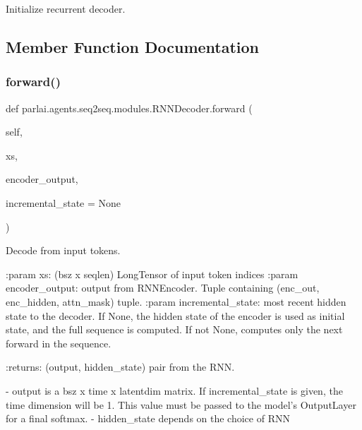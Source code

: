 \begin{DoxyVerb}Initialize recurrent decoder.
\end{DoxyVerb}
 

\subsection{Member Function Documentation}
\mbox{\label{classparlai_1_1agents_1_1seq2seq_1_1modules_1_1RNNDecoder_a883315b7f0f57ccf17c96fc8f24ddc11}} 
\subsubsection{\texorpdfstring{forward()}{forward()}}
{\footnotesize\ttfamily def parlai.\+agents.\+seq2seq.\+modules.\+R\+N\+N\+Decoder.\+forward (\begin{DoxyParamCaption}\item[{}]{self,  }\item[{}]{xs,  }\item[{}]{encoder\+\_\+output,  }\item[{}]{incremental\+\_\+state = {\ttfamily None} }\end{DoxyParamCaption})}

\begin{DoxyVerb}Decode from input tokens.

:param xs: (bsz x seqlen) LongTensor of input token indices
:param encoder_output: output from RNNEncoder. Tuple containing
    (enc_out, enc_hidden, attn_mask) tuple.
:param incremental_state: most recent hidden state to the decoder.
    If None, the hidden state of the encoder is used as initial state,
    and the full sequence is computed. If not None, computes only the
    next forward in the sequence.

:returns: (output, hidden_state) pair from the RNN.

    - output is a bsz x time x latentdim matrix. If incremental_state is
given, the time dimension will be 1. This value must be passed to
the model's OutputLayer for a final softmax.
    - hidden_state depends on the choice of RNN
\end{DoxyVerb}
 

